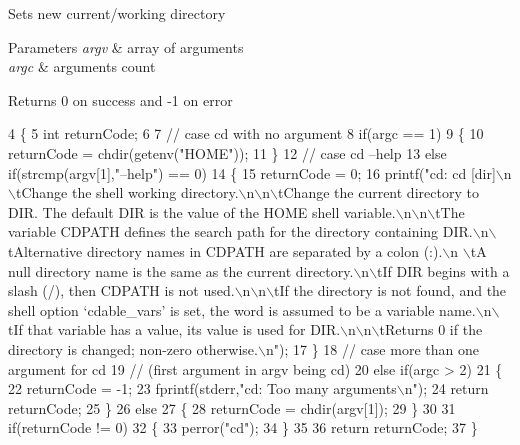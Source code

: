 Sets new current/working directory 
\begin{DoxyParams}{Parameters}
{\em argv} & array of arguments \\
\hline
{\em argc} & arguments count\\
\hline
\end{DoxyParams}
\begin{DoxyReturn}{Returns}
0 on success and -\/1 on error 
\end{DoxyReturn}

\begin{DoxyCode}
4 \{
5     \textcolor{keywordtype}{int} returnCode;
6 
7     \textcolor{comment}{// case cd with no argument}
8     \textcolor{keywordflow}{if}(argc == 1)
9     \{
10         returnCode = chdir(getenv(\textcolor{stringliteral}{"HOME"}));
11     \}
12     \textcolor{comment}{// case cd --help}
13     \textcolor{keywordflow}{else} \textcolor{keywordflow}{if}(strcmp(argv[1],\textcolor{stringliteral}{"--help"}) == 0)
14     \{
15         returnCode = 0;
16         printf(\textcolor{stringliteral}{"cd: cd [dir]\(\backslash\)n\(\backslash\)tChange the shell working directory.\(\backslash\)n\(\backslash\)n\(\backslash\)tChange the current directory to
       DIR.  The default DIR is the value of the HOME shell variable.\(\backslash\)n\(\backslash\)n\(\backslash\)tThe variable CDPATH defines the search
       path for the directory containing DIR.\(\backslash\)n\(\backslash\)tAlternative directory names in CDPATH are separated by a colon (:).\(\backslash\)n
      \(\backslash\)tA null directory name is the same as the current directory.\(\backslash\)n\(\backslash\)tIf DIR begins with a slash (/), then CDPATH
       is not used.\(\backslash\)n\(\backslash\)n\(\backslash\)tIf the directory is not found, and the shell option `cdable\_vars' is set, the word is
       assumed to be  a variable name.\(\backslash\)n\(\backslash\)tIf that variable has a value, its value is used for DIR.\(\backslash\)n\(\backslash\)n\(\backslash\)tReturns 0 if
       the directory is changed; non-zero otherwise.\(\backslash\)n"});
17     \}
18     \textcolor{comment}{// case more than one argument for cd}
19     \textcolor{comment}{// (first argument in argv being cd)}
20     \textcolor{keywordflow}{else} \textcolor{keywordflow}{if}(argc > 2)
21     \{
22         returnCode = -1;
23         fprintf(stderr,\textcolor{stringliteral}{"cd: Too many arguments\(\backslash\)n"});
24         \textcolor{keywordflow}{return} returnCode;
25     \}
26     \textcolor{keywordflow}{else}
27     \{
28         returnCode = chdir(argv[1]);
29     \}
30 
31     \textcolor{keywordflow}{if}(returnCode != 0)
32     \{
33         perror(\textcolor{stringliteral}{"cd"});
34     \}
35 
36     \textcolor{keywordflow}{return} returnCode;
37 \}
\end{DoxyCode}
\mbox{\label{built-in_8c_ae985125913017d37bb75b1ab7b977950}} 
